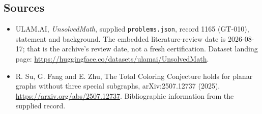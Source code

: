 \documentclass[11pt,a4paper]{article}
\begin{document}
\subsection{Sources}

{\small

\begin{itemize}

\item[\hypertarget{source:1165:1}{S1}] ULAM.AI, \emph{UnsolvedMath}, supplied \texttt{problems.json}, record 1165 (GT-010), statement and background. The embedded literature-review date is 2026-08-17; that is the archive’s review date, not a fresh certification. Dataset landing page: \url{https://huggingface.co/datasets/ulamai/UnsolvedMath}.

\item[\hypertarget{source:1165:2}{S2}] R. Su, G. Fang and E. Zhu, The Total Coloring Conjecture holds for planar graphs without three special subgraphs, arXiv:2507.12737 (2025). \url{https://arxiv.org/abs/2507.12737}. Bibliographic information from the supplied record.

\end{itemize}

}

\label{end:1165}
\end{document}
